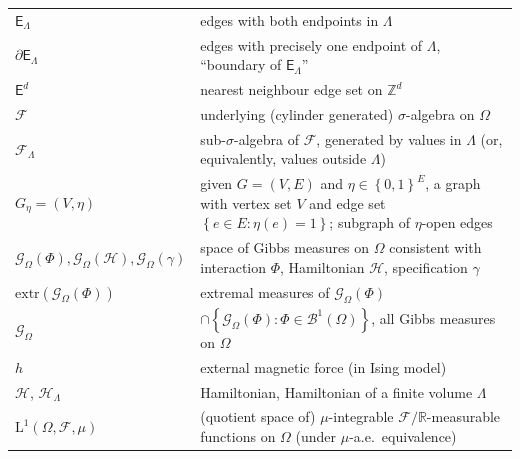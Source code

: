 \documentclass[12pt]{article}
\newcommand{\BB}{\mathscr{B}}
\newcommand{\E}{\mathsf{E}}
\newcommand{\F}{\mathcal{F}}
\newcommand{\G}{\mathcal{G}}
\renewcommand{\H}{\mathcal{H}}
\newcommand{\R}{\mathbb{R}}
\newcommand{\Z}{\mathbb{Z}}
\newcommand{\extr}{\mathrm{extr}}
\newcommand{\set}[1]{\left\{#1\right\}}
\newcommand{\1}{\mathbbm{1}}
\newcommand{\5}{\vspace{0.5cm}}
\theoremstyle{definition}
\begin{document}
\begin{tabular}{p{4cm}p{10cm}}
$\E_\Lambda$ & edges with both endpoints in $\Lambda$ \\
$\partial\E_\Lambda$ & edges with precisely one endpoint of $\Lambda$, ``boundary of $\E_\Lambda$'' \\
$\E^d$ & nearest neighbour edge set on $\Z^d$ \\
$\F$ & underlying (cylinder generated) $\sigma$-algebra on $\Omega$ \\
$\F_\Lambda$ & sub-$\sigma$-algebra of $\F$, generated by values in $\Lambda$ (or, equivalently, values outside $\Lambda$)  \\
$G_\eta=(V,\eta)$ & given $G=(V,E)$ and $\eta\in\set{0,1}^E$, a graph with vertex set $V$ and edge set $\set{e\in E:\eta(e)=1}$; subgraph of $\eta$-open edges \\
$\G_\Omega(\Phi),\G_\Omega(\H),\G_\Omega(\gamma)$ & space of Gibbs measures on $\Omega$ consistent with interaction $\Phi$, Hamiltonian $\H$, specification $\gamma$\\
$\extr(\G_\Omega(\Phi))$ & extremal measures of $\G_\Omega(\Phi)$ \\
$\G_\Omega$ & $\cap\set{\G_\Omega(\Phi):\Phi\in\BB^1(\Omega)}$, all Gibbs measures on $\Omega$ \\
$h$ & external magnetic force (in Ising model) \\
$\H$, $\H_\Lambda$ & Hamiltonian, Hamiltonian of a finite volume $\Lambda$ \\
$\mathrm{L}^1(\Omega,\F,\mu)$ & (quotient space of) $\mu$-integrable $\F/\R$-measurable functions on $\Omega$ (under $\mu$-a.e.~equivalence) 
\end{tabular} 

\pagebreak
\end{document}
